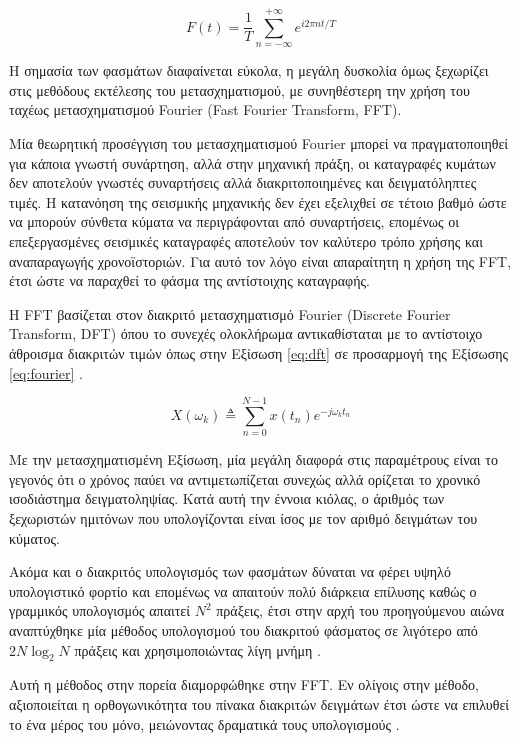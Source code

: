 \begin{equation}
	F(t) = \frac{1}{T}\sum_{n=-\infty}^{+\infty}e^{i2\pi nt/T}
	\label{eq:per-four}
\end{equation}

Η σημασία των φασμάτων διαφαίνεται εύκολα, η μεγάλη δυσκολία όμως ξεχωρίζει στις μεθόδους εκτέλεσης του μετασχηματισμού, με συνηθέστερη την χρήση του ταχέως μετασχηματισμού Fourier (Fast Fourier Transform, FFT).

Μία θεωρητική προσέγγιση του μετασχηματισμού Fourier μπορεί να πραγματοποιηθεί για κάποια γνωστή συνάρτηση, αλλά στην μηχανική πράξη, οι καταγραφές κυμάτων δεν αποτελούν γνωστές συναρτήσεις αλλά διακριτοποιημένες και δειγματόληπτες τιμές. Η κατανόηση της σεισμικής μηχανικής δεν έχει εξελιχθεί σε τέτοιο βαθμό ώστε να μπορούν σύνθετα κύματα να περιγράφονται από συναρτήσεις, επομένως οι επεξεργασμένες σεισμικές καταγραφές αποτελούν τον καλύτερο τρόπο χρήσης και αναπαραγωγής χρονοϊστοριών. Για αυτό τον λόγο είναι απαραίτητη η χρήση της FFT, έτσι ώστε να παραχθεί το φάσμα της αντίστοιχης καταγραφής.

Η FFT βασίζεται στον διακριτό μετασχηματισμό Fourier (Discrete Fourier Transform, DFT) όπου το συνεχές ολοκλήρωμα αντικαθίσταται με το αντίστοιχο άθροισμα διακριτών τιμών όπως στην Εξίσωση \ref{eq:dft} σε προσαρμογή της Εξίσωσης \ref{eq:fourier} \parencite{Smith}.

\begin{equation}
	X(\omega_k) \triangleq \sum_{n=0}^{N-1} x(t_n) e^{-j\omega_kt_n}
	\label{eq:dft}
\end{equation}

Με την μετασχηματισμένη Εξίσωση, μία μεγάλη διαφορά στις παραμέτρους είναι το γεγονός ότι ο χρόνος παύει να αντιμετωπίζεται συνεχώς αλλά ορίζεται το χρονικό ισοδιάστημα δειγματοληψίας. Κατά αυτή την έννοια κιόλας, ο άριθμός των ξεχωριστών ημιτόνων που υπολογίζονται είναι ίσος με τον αριθμό δειγμάτων του κύματος.

Ακόμα και ο διακριτός υπολογισμός των φασμάτων δύναται να φέρει υψηλό υπολογιστικό φορτίο και επομένως να απαιτούν πολύ διάρκεια επίλυσης καθώς ο γραμμικός υπολογισμός απαιτεί $N^2$ πράξεις, έτσι στην αρχή του προηγούμενου αιώνα αναπτύχθηκε μία μέθοδος υπολογισμού του διακριτού φάσματος σε λιγότερο από $2N\log_2 N$ πράξεις και χρησιμοποιώντας λίγη μνήμη \parencite{Cooley}. 

Αυτή η μέθοδος στην πορεία διαμορφώθηκε στην FFT. Εν ολίγοις στην μέθοδο, αξιοποιείται η ορθογωνικότητα του πίνακα διακριτών δειγμάτων έτσι ώστε να επιλυθεί το ένα μέρος του μόνο, μειώνοντας δραματικά τους υπολογισμούς \parencite{Brigham}.

